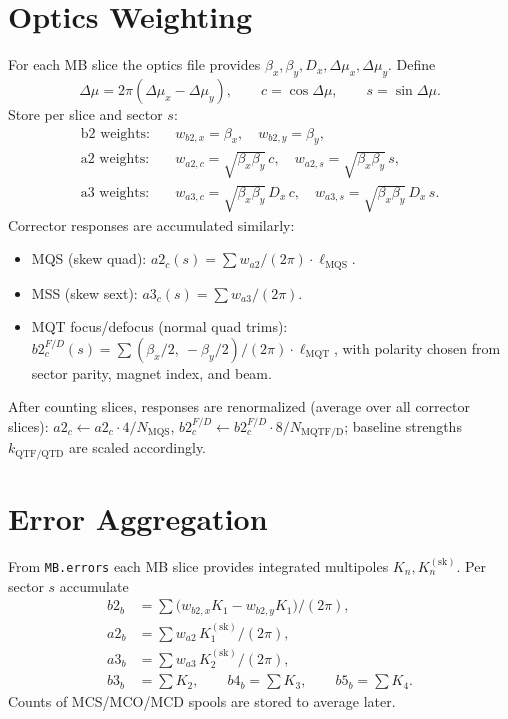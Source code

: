 \documentclass[11pt]{article}
\begin{document}
\section{Optics Weighting}
For each MB slice the optics file provides $\beta_x,\beta_y, D_x, \Delta\mu_x, \Delta\mu_y$. Define
\[
\Delta\mu = 2\pi(\Delta\mu_x-\Delta\mu_y),\qquad c=\cos\Delta\mu,\qquad s=\sin\Delta\mu.
\]
Store per slice and sector $s$:
\begin{align*}
\text{b2 weights:}&\quad w_{b2,x}=\beta_x,\quad w_{b2,y}=\beta_y,\\
\text{a2 weights:}&\quad w_{a2,c}=\sqrt{\beta_x\beta_y}\,c,\quad w_{a2,s}=\sqrt{\beta_x\beta_y}\,s,\\
\text{a3 weights:}&\quad w_{a3,c}=\sqrt{\beta_x\beta_y}\,D_x\,c,\quad w_{a3,s}=\sqrt{\beta_x\beta_y}\,D_x\,s.
\end{align*}
Corrector responses are accumulated similarly:
\begin{itemize}
  \item MQS (skew quad): $a2_c(s) = \sum w_{a2}/(2\pi)\cdot \ell_{\mathrm{MQS}}$.
  \item MSS (skew sext): $a3_c(s) = \sum w_{a3}/(2\pi)$.
  \item MQT focus/defocus (normal quad trims): $b2_c^{F/D}(s) = \sum (\beta_x/2,\ -\beta_y/2)/(2\pi)\cdot \ell_{\mathrm{MQT}}$, with polarity chosen from sector parity, magnet index, and beam.
\end{itemize}
After counting slices, responses are renormalized (average over all corrector slices): $a2_c \gets a2_c\cdot 4/N_{\mathrm{MQS}}$, $b2_c^{F/D}\gets b2_c^{F/D}\cdot 8/N_{\mathrm{MQTF/D}}$; baseline strengths $k_{\mathrm{QTF/QTD}}$ are scaled accordingly.

\section{Error Aggregation}
From \texttt{MB.errors} each MB slice provides integrated multipoles $K_n, K_n^{(\mathrm{sk})}$. Per sector $s$ accumulate
\begin{align*}
b2_b &= \sum \bigl(w_{b2,x} K_1 - w_{b2,y} K_1\bigr)/(2\pi),\\
a2_b &= \sum w_{a2}\, K_1^{(\mathrm{sk})}/(2\pi),\\
a3_b &= \sum w_{a3}\, K_2^{(\mathrm{sk})}/(2\pi),\\
b3_b &= \sum K_2,\qquad b4_b = \sum K_3,\qquad b5_b = \sum K_4.
\end{align*}
Counts of MCS/MCO/MCD spools are stored to average later.
\end{document}
